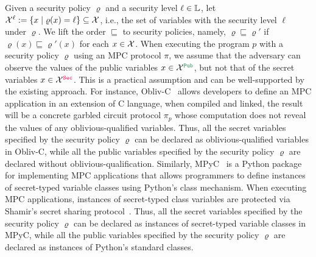 Given a security policy $\varrho$ and a security level $\ell\in \mathbb{L}$,
let $\mathcal{X}^\ell:=\{x\mid \varrho(x)=\ell\}\subseteq \mathcal{X}$, i.e., the set of
variables with the security level $\ell$ under $\varrho$.
We lift the order $\sqsubseteq$ to security policies, namely, $\varrho\sqsubseteq\varrho'$  if $\varrho(x)\sqsubseteq\varrho'(x)$ for each $x\in \mathcal{X}$.
%
When executing the program $p$ with a security policy $\varrho$ using an MPC protocol $\pi$, we assume that
the adversary can observe the values of the public variables $x\in \Var^{\Pub}$,
but not that of the secret variables $x\in \Var^{\Sec}$. This is a practical assumption and can be  well-supported by the existing approach.
For instance, Obliv-C~\cite{ZahurE15} allows developers to define an MPC application in an extension of C language, when compiled and linked, the result will be a concrete garbled circuit protocol $\pi_p$ whose computation does not reveal the values of any oblivious-qualified variables.
Thus, all the secret variables specified by the security policy $\varrho$ can be declared as oblivious-qualified variables in Obliv-C,
while all the public variables specified by the security policy $\varrho$ are declared without oblivious-qualification.
Similarly,
MPyC~\cite{MPyC20} is a Python package for implementing MPC applications that allows programmers to define instances of secret-typed variable classes using Python's class mechanism.
When executing MPC applications, instances of secret-typed class variables are protected via Shamir's secret sharing protocol~\cite{Shamir79}.
Thus, all the secret variables specified by the security policy $\varrho$ can be declared as instances of secret-typed variable classes in MPyC,
while all the public variables specified by the security policy $\varrho$ are declared as instances of Python's standard classes.


